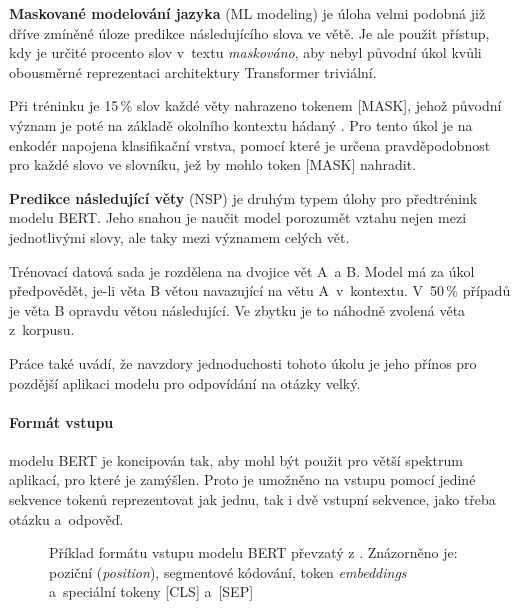 \medskip
\textbf{Maskované modelování jazyka} (ML modeling) 
je úloha velmi podobná již dříve zmíněné úloze predikce následujícího slova ve větě. Je ale použit přístup, kdy je určité procento slov v~textu \emph{maskováno}, aby nebyl původní úkol kvůli obousměrné reprezentaci architektury Transformer triviální.\par
Při tréninku je 15\,\% slov každé věty nahrazeno tokenem [MASK], jehož původní význam je poté na základě okolního kontextu hádaný \cite{BERT}. Pro tento úkol je na enkodér napojena klasifikační vrstva, pomocí které je určena pravděpodobnost pro každé slovo ve slovníku, jež by mohlo token [MASK] nahradit.\par
\smallskip
\textbf{Predikce následující věty} (NSP) je druhým typem úlohy pro předtrénink modelu BERT. Jeho snahou je naučit model porozumět vztahu nejen mezi jednotlivými slovy, ale taky mezi významem celých vět.\par
Trénovací datová sada je rozdělena na dvojice vět A~a B. Model má za úkol předpovědět, je-li věta B větou navazující na větu A~v~kontextu. V~50\,\% případů je věta B opravdu větou následující. Ve zbytku je to náhodně zvolená věta z~korpusu.\par
Práce \cite{BERT} také uvádí, že navzdory jednoduchosti tohoto úkolu je jeho přínos pro pozdější aplikaci modelu pro odpovídání na otázky velký.\par

\paragraph{Formát vstupu}
modelu BERT je koncipován tak, aby mohl být použit pro větší spektrum aplikací, pro které je zamýšlen. Proto je umožněno na vstupu pomocí jediné sekvence tokenů reprezentovat jak jednu, tak i dvě vstupní sekvence, jako třeba otázku a~odpověď.

\begin{figure}[hbt]
	\centering
	\caption{Příklad formátu vstupu  modelu BERT převzatý z \cite{BERT}. Znázorněno je: poziční (\emph{position}), segmentové kódování, token \emph{embeddings} a~speciální tokeny [CLS] a~[SEP]}
	\label{bert_input}
\end{figure}

